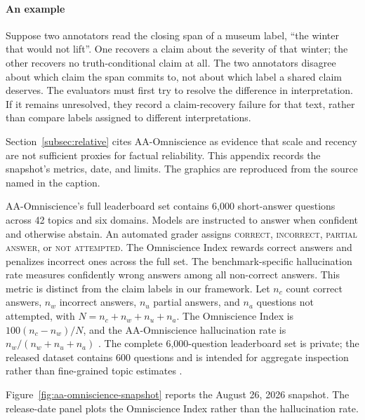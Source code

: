 \documentclass{clv2025}
\begin{document}
\paragraph{An example}
Suppose two annotators read the closing span of a museum label, ``the winter
that would not lift''.
One recovers a claim about the severity of that winter; the other recovers no
truth-conditional claim at all.
The two annotators disagree about which claim the span commits to, not about
which label a shared claim deserves.
The evaluators must first try to resolve the difference in interpretation.
If it remains unresolved, they record a claim-recovery failure for that text,
rather than compare labels assigned to different interpretations.

%
\makeatletter\def\@currentlabel{B}\makeatother\label{app:omniscience}

Section~\ref{subsec:relative} cites AA-Omniscience as evidence that scale and
recency are not sufficient proxies for factual reliability.
This appendix records the snapshot's metrics, date, and limits. The graphics
are reproduced from the source named in the caption.

AA-Omniscience's full leaderboard set contains 6,000 short-answer questions
across 42 topics and six domains.
Models are instructed to answer when confident and otherwise abstain. An
automated grader assigns \textsc{correct}, \textsc{incorrect},
\textsc{partial answer}, or \textsc{not attempted}. The Omniscience Index
rewards correct answers and penalizes incorrect ones across the full set. The
benchmark-specific hallucination rate measures confidently wrong answers among
all non-correct answers. This metric is distinct from the claim labels in
our framework. Let $n_c$ count correct answers, $n_w$ incorrect answers,
$n_u$ partial answers, and $n_a$ questions not attempted, with
$N=n_{c}+n_{w}+n_{u}+n_{a}$. The Omniscience Index is
$100(n_{c}-n_{w})/N$, and the AA-Omniscience hallucination rate is
$n_{w}/(n_{w}+n_{u}+n_{a})$ \citep{jackson_aaomniscience_2025}.
The complete 6,000-question leaderboard set is private; the released dataset
contains 600 questions and is intended for aggregate inspection rather than
fine-grained topic estimates
\citep{artificialanalysis_aaomniscience_public_2025}.

Figure~\ref{fig:aa-omniscience-snapshot} reports the August 26, 2026 snapshot.
The release-date panel plots the Omniscience Index rather than the
hallucination rate.
\end{document}
